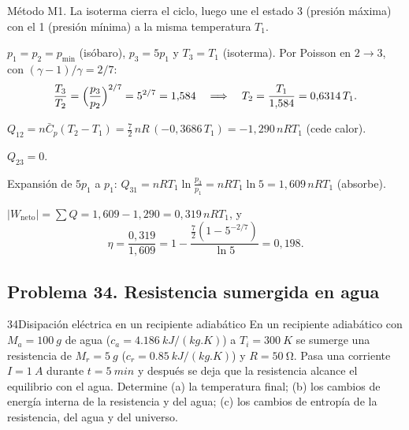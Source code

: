 \begin{resolucion}
\idea Método M1. La isoterma cierra el ciclo, luego une el estado 3 (presión máxima) con el 1 (presión mínima) a
la misma temperatura $T_1$.

 $p_1=p_2=p_{\min}$ (isóbaro), $p_3=5p_1$ y $T_3=T_1$ (isoterma). Por Poisson en $2\to3$,
con $(\gamma-1)/\gamma=2/7$:
\[
  \frac{T_3}{T_2}=\Bigl(\frac{p_3}{p_2}\Bigr)^{2/7}=5^{2/7}=1{,}584\quad\Longrightarrow\quad T_2=\frac{T_1}{1{,}584}=0{,}6314\,T_1 .
\]

$Q_{12}=n\bar C_p(T_2-T_1)=\tfrac72\,nR\,(-0{,}3686\,T_1)=-1{,}290\,nRT_1$ (cede calor).

 $Q_{23}=0$.

 Expansión de $5p_1$ a $p_1$:
$Q_{31}=nRT_1\ln\frac{p_3}{p_1}=nRT_1\ln5=1{,}609\,nRT_1$ (absorbe).

 $|W_{\mathrm{neto}}|=\sum Q=1{,}609-1{,}290=0{,}319\,nRT_1$, y
\[
  \eta=\frac{0{,}319}{1{,}609}=1-\frac{\frac72(1-5^{-2/7})}{\ln5}=\boxed{0{,}198}.
\]
\end{resolucion}



\subsection{Problema 34. Resistencia sumergida en agua}
\begin{problema}{34}{Disipación eléctrica en un recipiente adiabático}
En un recipiente adiabático con $M_a=\SI{100}{g}$ de agua ($c_a=\SI{4,186}{kJ/(kg.K)}$) a $T_i=\SI{300}{K}$ se sumerge una
resistencia de $M_r=\SI{5}{g}$ ($c_r=\SI{0,85}{kJ/(kg.K)}$) y $R=\SI{50}{\ohm}$. Pasa una corriente $I=\SI{1}{A}$ durante
$t=\SI{5}{min}$ y después se deja que la resistencia alcance el equilibrio con el agua. Determine (a) la temperatura
final; (b) los cambios de energía interna de la resistencia y del agua; (c) los cambios de entropía de la
resistencia, del agua y del universo.
\end{problema}

